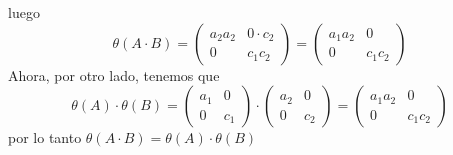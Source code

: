 \documentclass[10pt,a4paper]{article} %
\begin{document}
                luego
                \begin{equation}
                    \theta (A \cdot B) =
                    \begin{pmatrix}
                        a_2a_2 & 0 \cdot c_2
                        \\
                        0 & c_1c_2
                    \end{pmatrix}
                    =
                    \begin{pmatrix}
                        a_1 a_2 & 0
                        \\
                        0 & c_1 c_2
                    \end{pmatrix}
                \end{equation}
                Ahora, por otro lado, tenemos que
                \begin{equation}
                    \theta (A) \cdot \theta (B) =
                    \begin{pmatrix}
                        a_1 & 0
                        \\
                        0 & c_1
                    \end{pmatrix}
                    \cdot
                    \begin{pmatrix}
                        a_2 & 0
                        \\
                        0 & c_2
                    \end{pmatrix}
                    =
                    \begin{pmatrix}
                        a_1a_2 & 0
                        \\
                        0 & c_1 c_2
                    \end{pmatrix}
                \end{equation}
                por lo tanto $ \theta (A \cdot B) = \theta (A) \cdot \theta (B)  $
\end{document}
